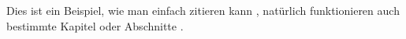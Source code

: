 	
	
	Dies ist ein Beispiel, wie man einfach zitieren kann 
	\citep{smith2009}, natürlich funktionieren auch bestimmte Kapitel oder Abschnitte \citep[Kapitel 1]{smith2010}.
	
	




	\printbibliography[heading=bibintoc]
	
	
	
	\pagestyle{plain}
	
	


	
		





